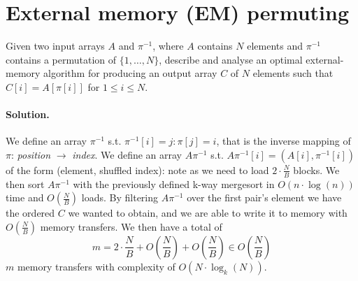 \section{External memory (EM) permuting}
Given two input arrays $A$ and $\pi^{-1}$, where $A$ contains $N$ elements and $\pi^{-1}$ contains a permutation of $\{1, \dots, N\}$, describe and analyse an optimal external-memory algorithm for producing an output array $C$ of $N$ elements such that $C[i] = A[\pi[i]]$ for $1 \leq i \leq N$.

\vspace{0.5cm} \paragraph{Solution.}
We define an array $\pi^{-1}$ s.t. $\pi^{-1}[i] = j : \pi[j] = i$, that is the inverse mapping of $\pi$: \emph{position} $\to$ \emph{index}.
We define an array $A\pi^{-1}$ s.t. $A\pi^{-1}[i] = (A[i], \pi^{-1}[i])$ of the form (element, shuffled index): note as we need to load $2 \cdot \frac{N}{B}$ blocks.
We then sort $A\pi^{-1}$ with the previously defined k-way mergesort in $O(n \cdot \log(n))$ time and $O(\frac{N}{B})$ loads.
By filtering $A\pi^{-1}$ over the first pair's element we have the ordered $C$ we wanted to obtain, and we are able to write it to memory with $O(\frac{N}{B})$ memory transfers.
We then have a total of
\begin{equation*}
m = 2 \cdot \frac{N}{B} + O(\frac{N}{B}) + O(\frac{N}{B}) \in O(\frac{N}{B})
\end{equation*}
$m$ memory transfers with complexity of $O(N \cdot \log_k(N))$.
